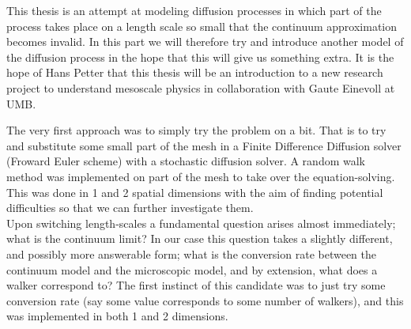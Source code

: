 This thesis is an attempt at modeling diffusion processes in which part of the process takes place on a length scale so small that the continuum approximation becomes invalid. 
In this part we will therefore try and introduce another model of the diffusion process in the hope that this will give us something extra. 
It is the hope of Hans Petter that this thesis will be an introduction to a new research project to understand mesoscale physics in collaboration with Gaute Einevoll at UMB.

The very first approach was to simply try the problem on a bit. That is to try and substitute some small part of the mesh in a Finite Difference Diffusion solver (Froward Euler scheme) with a stochastic diffusion solver. A random walk method was implemented on part of the mesh to take over the equation-solving. This was done in 1 and 2 spatial dimensions with the aim of finding potential difficulties so that we can further investigate them. \\
Upon switching length-scales a fundamental question arises almost immediately; what is the continuum limit? In our case this question takes a slightly different, and possibly more answerable form; what is the conversion rate between the continuum model and the microscopic model, and by extension, what does a walker correspond to?
The first instinct of this candidate was to just try some conversion rate (say some value corresponds to some number of walkers), and this was implemented in both 1 and 2 dimensions.